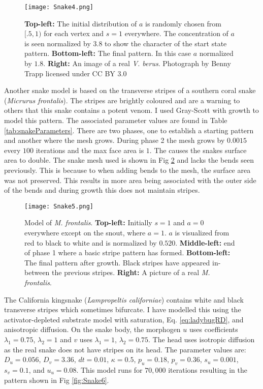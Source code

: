 \begin{figure}[ht]
	\centering
	\texttt{[image: Snake4.png]}
	\caption{\textbf{Top-left:} The initial distribution of $a$ is randomly chosen from $[.5, 1)$ for each vertex and $s=1$ everywhere. The concentration of $a$ is seen normalized by 3.8 to show the character of the start state pattern. \textbf{Bottom-left:} The final pattern. In this case $a$ normalized by $1.8$. \textbf{Right:} An image of a real \textit{V. berus}. Photograph by Benny Trapp licensed under CC BY 3.0}
	\label{fig:Snake4}
\end{figure}

Another snake model is based on the transverse stripes of a southern coral snake (\textit{Micrurus frontalis}). The stripes are brightly coloured and are a warning to others that this snake contains a potent venom. I used Gray-Scott with growth to model this pattern. The associated parameter values are found in Table \ref{tab:snakeParameters}. There are two phases, one to establish a starting pattern and another where the mesh grows. During phase 2 the mesh grows by $0.0015$ every $100$ iterations and the max face area is $1$. The causes the snakes surface area to double. The snake mesh used is shown in Fig \ref{fig:Snake5} and lacks the bends seen previously. This is because to when adding bends to the mesh, the surface area was not preserved. This results in more area being associated with the outer side of the bends and during growth this does not maintain stripes.

\begin{figure}[ht]
	\centering
	\texttt{[image: Snake5.png]}
	\caption{Model of \textit{M. frontalis}. \textbf{Top-left:} Initially $s=1$ and $a=0$ everywhere except on the snout, where $a=1$. $a$ is visualized from red to black to white and is normalized by $0.520$. \textbf{Middle-left:} end of phase 1 where a basic stripe pattern has formed. \textbf{Bottom-left:} The final pattern after growth. Black stripes have appeared in-between the previous stripes. \textbf{Right:} A picture of a real \textit{M. frontalis}.}
	\label{fig:Snake5}
\end{figure}

\newpage 

The California kingsnake (\textit{Lampropeltis californiae}) contains white and black transverse stripes which sometimes bifurcate. I have modelled this using the activator-depleted substrate model with saturation, Eq. \ref{eq:ladybugRD}, and anisotropic diffusion. On the snake body, the morphogen $u$ uses coefficients $\lambda_{1}=0.75$, $\lambda_{2}=1$ and $v$ uses $\lambda_{1}=1$, $\lambda_{2}=0.75$. The head uses isotropic diffusion as the real snake does not have stripes on its head. The parameter values are: $D_u=0.056$, $D_v=3.36$, $dt=0.01$, $\kappa=0.5$, $p_u=0.18$, $p_v=0.36$, $s_u=0.001$, $s_v=0.1$, and $u_u=0.08$. This model runs for $70,000$ iterations resulting in the pattern shown in Fig \ref{fig:Snake6}.

